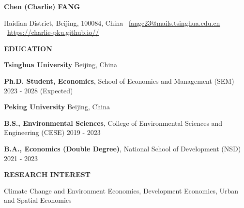 \documentclass[UTF8]{ctexbook}
\begin{document}
\begin{center}
    \textbf{Chen (Charlie) FANG}\\ 
    \hrulefill
\end{center}

\begin{center}
    Haidian District, Beijing, 100084, China \textbullet \ \href{mailto:fangc23@mails.tsinghua.edu.cn}{fangc23@mails.tsinghua.edu.cn} \textbullet \ \href{https://charlie-pku.github.io//}{https://charlie-pku.github.io//}
\end{center}

\vspace{0.5pt}

\begin{center}
    \textbf{EDUCATION}
\end{center}
\textbf{Tsinghua University} \hfill Beijing, China



\quad \textbf{Ph.D. Student, Economics}, School of Economics and Management (SEM) \hfill 2023 - 2028 (Expected)


\vspace{12pt}

\textbf{Peking University}  \hfill Beijing, China

\quad \textbf{B.S., Environmental Sciences}, College of Environmental Sciences and Engineering (CESE) \hfill	2019 - 2023

\quad \textbf{B.A., Economics (Double Degree)}, National School of Development (NSD) \hfill 2021 - 2023

\vspace{12pt}




\begin{center}
    \textbf{RESEARCH INTEREST}
\end{center}

Climate Change and Environment Economics, Development Economics, Urban and Spatial Economics

\vspace{12pt}
\end{document}
